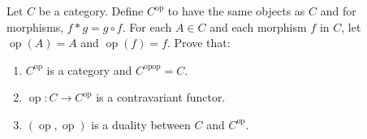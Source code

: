 Let $C$ be a category. Define $C^{\operatorname{op}}$ to have the same objects as $C$ and for morphisms, $f \ast g = g \circ f$. For each $A \in C$ and each morphism $f$ in $C$, let $\operatorname{op}(A) = A$ and $\operatorname{op}(f) = f$. Prove that:
\begin{enumerate}
    \item[(1)] $C^{\operatorname{op}}$ is a category and $C^{\operatorname{opop}} = C$.
    \item[(2)] $\operatorname{op}: C \to C^{\operatorname{op}}$ is a contravariant functor.
    \item[(3)] $(\operatorname{op}, \operatorname{op})$ is a duality between $C$ and $C^{\operatorname{op}}$.
\end{enumerate}
